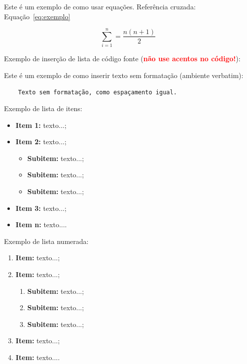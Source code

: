 Este é um exemplo de como usar equações. Referência cruzada: Equação~\ref{eq:exemplo}

\begin{equation}
\sum_{i=1}^{n} = \frac{n(n+1)}{2}
\label{eq:exemplo}
\end{equation}


Exemplo de inserção de lista de código fonte (\textbf{\textcolor{red}{não use acentos no código!}}):

 



Este é um exemplo de como inserir texto sem formatação (ambiente verbatim):

\begin{verbatim}
	Texto sem formatação, como espaçamento igual.
\end{verbatim}


Exemplo de lista de itens:

\begin{itemize}
	\item \textbf{Item 1:} texto...;
	\item \textbf{Item 2:} texto...;
    \begin{itemize}
            \item \textbf{Subitem:} texto...;
            \item \textbf{Subitem:} texto...;
            \item \textbf{Subitem:} texto...;
        \end{itemize}
	\item \textbf{Item 3:} texto...;
	\item \textbf{Item n:} texto....
\end{itemize}


Exemplo de lista numerada:

\begin{enumerate}
	\item \textbf{Item:} texto...;
	\item \textbf{Item:} texto...;
    \begin{enumerate}
        \item \textbf{Subitem:} texto...;
        \item \textbf{Subitem:} texto...;
        \item \textbf{Subitem:} texto...;
    \end{enumerate}
	\item \textbf{Item:} texto...;
	\item \textbf{Item:} texto....
\end{enumerate}


